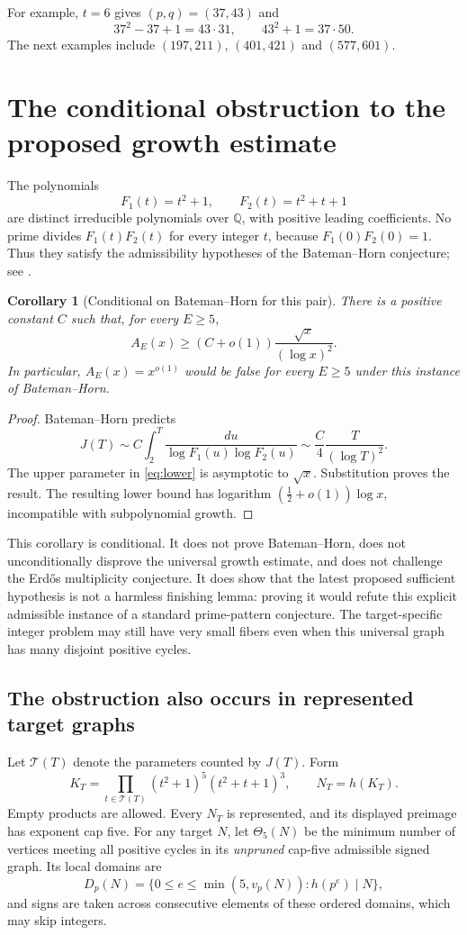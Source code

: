 \documentclass[11pt]{article}
\newtheorem{corollary}[theorem]{Corollary}
\begin{document}
For example, $t=6$ gives $(p,q)=(37,43)$ and
\[
 37^2-37+1=43\cdot31,\qquad43^2+1=37\cdot50.
\]
The next examples include $(197,211)$, $(401,421)$ and $(577,601)$.

\section{The conditional obstruction to the proposed growth estimate}
The polynomials
\[
 F_1(t)=t^2+1,\qquad F_2(t)=t^2+t+1
\]
are distinct irreducible polynomials over $\mathbb Q$, with positive leading coefficients. No prime divides $F_1(t)F_2(t)$ for every integer $t$, because $F_1(0)F_2(0)=1$. Thus they satisfy the admissibility hypotheses of the Bateman--Horn conjecture; see \cite[Section 3.6]{bh}.

\begin{corollary}[Conditional on Bateman--Horn for this pair]\label{cor:BH}
There is a positive constant $C$ such that, for every $E\ge5$,
\[
 A_E(x)\ge(C+o(1))\frac{\sqrt{x}}{(\log x)^2}.
\]
In particular, $A_E(x)=x^{o(1)}$ would be false for every $E\ge5$ under this instance of Bateman--Horn.
\end{corollary}
\begin{proof}
Bateman--Horn predicts
\[
 J(T)\sim C\int_2^T\frac{du}{\log F_1(u)\log F_2(u)}
 \sim \frac C4\frac{T}{(\log T)^2}.
\]
The upper parameter in \eqref{eq:lower} is asymptotic to $\sqrt{x}$. Substitution proves the result. The resulting lower bound has logarithm $(\tfrac12+o(1))\log x$, incompatible with subpolynomial growth.
\end{proof}

This corollary is conditional. It does not prove Bateman--Horn, does not unconditionally disprove the universal growth estimate, and does not challenge the Erd\H{o}s multiplicity conjecture. It does show that the latest proposed sufficient hypothesis is not a harmless finishing lemma: proving it would refute this explicit admissible instance of a standard prime-pattern conjecture. The target-specific integer problem may still have very small fibers even when this universal graph has many disjoint positive cycles.

\subsection{The obstruction also occurs in represented target graphs}
Let $\mathcal T(T)$ denote the parameters counted by $J(T)$. Form
\[
 K_T=\prod_{t\in\mathcal T(T)}(t^2+1)^5(t^2+t+1)^3,
 \qquad N_T=h(K_T).
\]
Empty products are allowed. Every $N_T$ is represented, and its displayed preimage has exponent cap five.
For any target $N$, let $\Theta_5(N)$ be the minimum number of vertices meeting all positive cycles in its \emph{unpruned} cap-five admissible signed graph. Its local domains are
\[
 D_p(N)=\{0\le e\le\min(5,v_p(N)):h(p^e)\mid N\},
\]
and signs are taken across consecutive elements of these ordered domains, which may skip integers.
\end{document}
